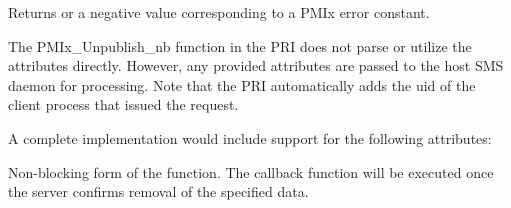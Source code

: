\begin{arglist}
\end{arglist}

Returns  or a negative value corresponding to a PMIx error constant.

\priattr
The PMIx_Unpublish_nb function in the \ac{PRI} does not parse or utilize the attributes directly. However, any provided attributes are passed to the host \ac{SMS} daemon for processing. Note that the \ac{PRI} automatically adds the uid of the client process that issued the request.

\optattr
A complete implementation would include support for the following attributes:


\descr

Non-blocking form of the  function.
The callback function will be executed once the server confirms removal of the specified data.



